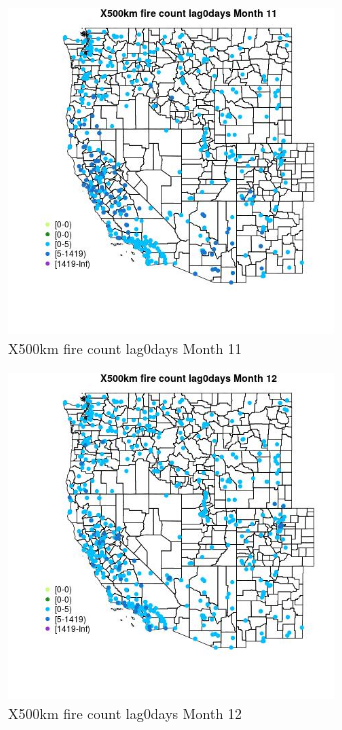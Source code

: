 \begin{figure} 
\centering  
\includegraphics[width=0.77\textwidth]{Code_Outputs/Report_ML_input_PM25_Step4_part_e_de_duplicated_aves_compiled_2019-05-14wNAs_MapObsMo11X500km_fire_count_lag0days.jpg} 
\caption{\label{fig:Report_ML_input_PM25_Step4_part_e_de_duplicated_aves_compiled_2019-05-14wNAsMapObsMo11X500km_fire_count_lag0days}X500km fire count lag0days Month 11} 
\end{figure} 
 

\begin{figure} 
\centering  
\includegraphics[width=0.77\textwidth]{Code_Outputs/Report_ML_input_PM25_Step4_part_e_de_duplicated_aves_compiled_2019-05-14wNAs_MapObsMo12X500km_fire_count_lag0days.jpg} 
\caption{\label{fig:Report_ML_input_PM25_Step4_part_e_de_duplicated_aves_compiled_2019-05-14wNAsMapObsMo12X500km_fire_count_lag0days}X500km fire count lag0days Month 12} 
\end{figure} 
 

